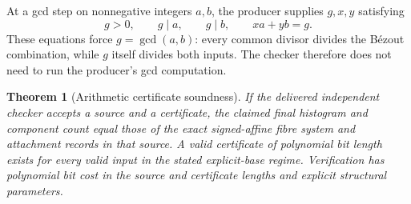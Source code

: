 \documentclass[11pt]{article}
\newtheorem{theorem}{Theorem}[section]
\theoremstyle{definition}
\begin{document}
At a gcd step on nonnegative integers $a,b$, the producer supplies $g,x,y$ satisfying
\begin{equation}
 g>0,\qquad g\mid a,\qquad g\mid b,\qquad xa+yb=g.
 \label{eq:gcdcertificate}
\end{equation}
These equations force $g=\gcd(a,b)$: every common divisor divides the B\'ezout combination, while $g$ itself divides both inputs. The checker therefore does not need to run the producer's gcd computation.

\begin{theorem}[Arithmetic certificate soundness]
\label{thm:certificate}
If the delivered independent checker accepts a source and a certificate, the claimed final histogram and component count equal those of the exact signed-affine fibre system and attachment records in that source. A valid certificate of polynomial bit length exists for every valid input in the stated explicit-base regime. Verification has polynomial bit cost in the source and certificate lengths and explicit structural parameters.
\end{theorem}
\end{document}
